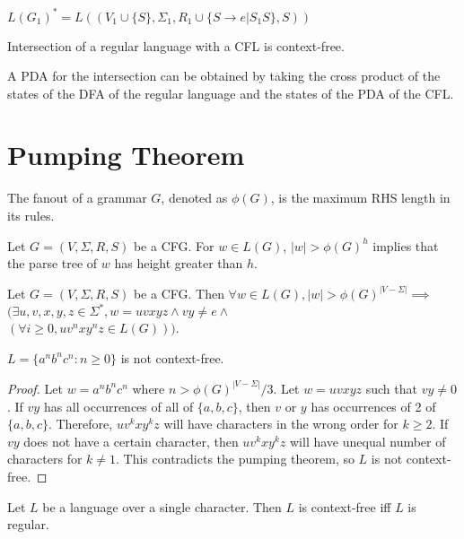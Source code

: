 $L(G_1)^* = L((V_1 \cup \{S\}, \Sigma_1,
R_1 \cup \{S \rightarrow e | S_1S \}, S))$

\begin{theorem}
Intersection of a regular language with a CFL is context-free.
\end{theorem}
A PDA for the intersection can be obtained by taking the
cross product of the states of the DFA of the regular language
and the states of the PDA of the CFL.

\section{Pumping Theorem}

\begin{definition}
The fanout of a grammar $G$, denoted as $\phi(G)$, is the maximum RHS length in its rules.
\end{definition}
\begin{lemma}
Let $G = (V, \Sigma, R, S)$ be a CFG.
For $w \in L(G)$, $|w| > \phi(G)^h$ implies that the parse tree of $w$ has height greater than $h$.
\end{lemma}
\begin{theorem}
Let $G = (V, \Sigma, R, S)$ be a CFG.
Then $\forall w \in L(G), |w| > \phi(G)^{|V - \Sigma|} \implies$\\
$(\exists u, v, x, y, z \in \Sigma^*, w = uvxyz \wedge vy \neq e \wedge$\\
$(\forall i \ge 0, uv^nxy^nz \in L(G)))$.
\end{theorem}

\begin{corollary}
$L = \{a^nb^nc^n: n \ge 0\}$ is not context-free.
\end{corollary}
\begin{proof}
Let $w = a^nb^nc^n$ where $n > \phi(G)^{|V-\Sigma|}/3$.
Let $w = uvxyz$ such that $vy \neq 0$.
If $vy$ has all occurrences of all of $\{a, b, c\}$,
then $v$ or $y$ has occurrences of 2 of $\{a, b, c\}$.
Therefore, $uv^kxy^kz$ will have characters in the wrong order for $k \ge 2$.
If $vy$ does not have a certain character,
then $uv^kxy^kz$ will have unequal number of characters for $k \neq 1$.
This contradicts the pumping theorem, so $L$ is not context-free.
\end{proof}

\begin{theorem}
Let $L$ be a language over a single character.
Then $L$ is context-free iff $L$ is regular.
\end{theorem}

